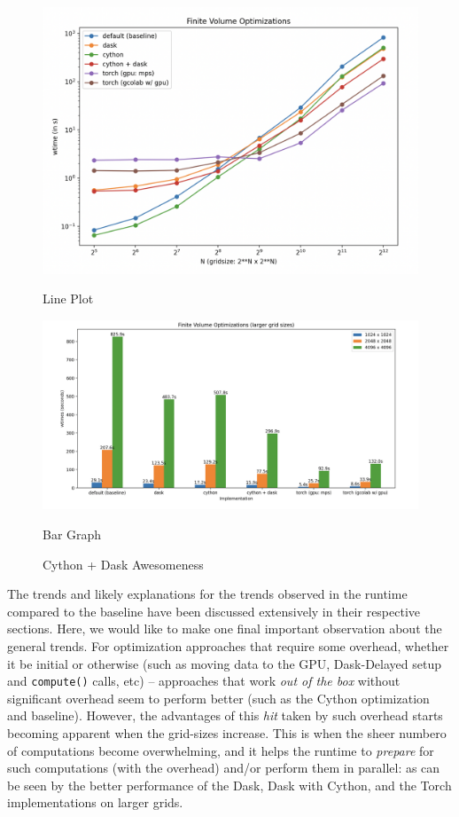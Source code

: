 \documentclass[a4paper,10pt]{article}
\begin{document}
\begin{figure}[h!]
   \begin{minipage}{0.5\textwidth}
       \centering
       \includegraphics[width=\linewidth]{images/final/final_plot.png}
      \caption{Line Plot}
       \label{fig:final_plot}
   \end{minipage}
   \hspace{0.1cm}
   \begin{minipage}{0.5\textwidth}
       \centering
       \includegraphics[width=\linewidth]{images/final/final_bar.png}
      \caption{Bar Graph}
      \label{fig:final_bar}
  \end{minipage}
  \caption{Cython + Dask Awesomeness}
\end{figure}
The trends and likely explanations for the trends observed in the runtime compared to the baseline have been discussed extensively in their respective sections.
Here, we would like to make one final important observation about the general trends.
For optimization approaches that require some overhead, whether it be initial or otherwise (such as moving data to the GPU, Dask-Delayed setup and \verb|compute()| calls, etc) -- approaches that work \textit{out of the box} without significant overhead seem to perform better (such as the Cython optimization and baseline).
However, the advantages of this \textit{hit} taken by such overhead starts becoming apparent when the grid-sizes increase.
This is when the sheer numbero of computations become overwhelming, and it helps the runtime to \textit{prepare} for such computations (with the overhead) and/or perform them in parallel: as can be seen by the better performance of the Dask, Dask with Cython, and the Torch implementations on larger grids.
\end{document}
